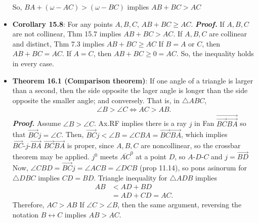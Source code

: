 \documentclass{report}
\begin{document}
\begin{itemize}
            \bigbreak \noindent 
            \bigbreak \noindent 
            So, $BA + (\omega - AC) > (\omega -BC) $ implies $AB + BC > AC$ \endpf
        \item \textbf{Corollary 15.8}: For any points $A,B,C$, $AB + BC \geq AC$. 
            \bigbreak \noindent 
            \textbf{\textit{Proof.}} If $A,B,C $ are not collinear, Thm 15.7 implies $AB + BC > AC$. If $A,B,C$ are collinear and distinct, Thm 7.3 implies $AB + BC \geq AC$
            \bigbreak \noindent 
            If $B = A$ or $C$, then $ AB + BC = AC$. If $A = C$, then $AB + BC \geq 0 = AC$. So, the inequality holds in every case.
        \item \textbf{Theorem 16.1 (Comparison theorem)}: If one angle of a triangle is larger than a second, then the side opposite the lager angle is longer than the side opposite the smaller angle; and conversely. 
            \bigbreak \noindent 
            That is, in $\triangle ABC$, 
            \begin{align*}
                \angle B > \angle C \iff AC > AB
            .\end{align*}
            \bigbreak \noindent 
            \textbf{\textit{Proof.}} Assume $\angle B > \angle C$. Ax.RF implies there is a ray $j$ in Fan $\overrightarrow{\overrightarrow{BC}\overrightarrow{BA}} $ so that $\overrightarrow{BC}j = \angle C$. Then, $\overrightarrow{BC}j < \angle B = \angle CBA = \overrightarrow{BC}\overrightarrow{BA}$, which implies $ \overrightarrow{BC}\text{-}j\text{-}\overrightarrow{BA}$
            \bigbreak \noindent 
            $\underline{\overrightarrow{BC}\overrightarrow{BA}}$ is proper, since $A,B,C$ are noncollinear, so the crossbar theorem may be applied.
            \bigbreak \noindent 
            $j^{0}$ meets $\overline{AC}^{0}$ at a point $D$, so $ A\text{-}D\text{-}C$ and $ j = \overrightarrow{BD} $
            \bigbreak \noindent 
            Now, $\angle CBD = \overrightarrow{BC}j = \angle ACB = \angle DCB$ (prop 11.14), so pons asinorum for $ \triangle DBC $ implies $ CD = BD$. Triangle inequality for $ \triangle ADB $ implies 
            \begin{align*}
                AB &< AD + BD \\
                   &= AD + CD = AC
            .\end{align*}
            Therefore, $ AC > AB$
            \bigbreak \noindent 
            If $ \angle C  > \angle B$, then the same argument, reversing the notation $ B \leftrightarrow C$ implies $ AB > AC$.

\end{itemize}
\end{document}
